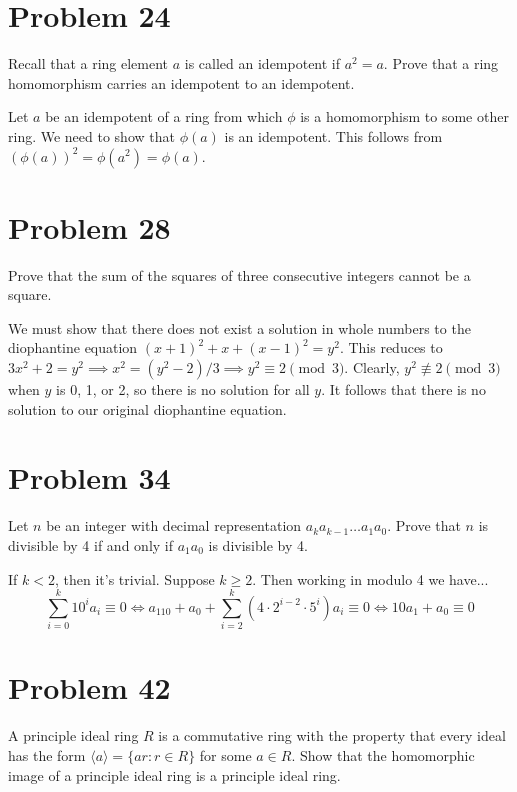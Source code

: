 \documentclass{article}
\begin{document}
\section*{Problem 24}

Recall that a ring element $a$ is called an idempotent if $a^2=a$.
Prove that a ring homomorphism carries an idempotent to an idempotent.

Let $a$ be an idempotent of a ring from which $\phi$ is a homomorphism
to some other ring.
We need to show that $\phi(a)$ is an idempotent.
This follows from $(\phi(a))^2=\phi(a^2)=\phi(a)$.

\section*{Problem 28}

Prove that the sum of the squares of three consecutive integers cannot be a square.

We must show that there does not exist a solution in whole numbers
to the diophantine equation $(x+1)^2+x+(x-1)^2=y^2$.
This reduces to $3x^2+2=y^2\implies x^2=(y^2-2)/3\implies y^2\equiv 2\pmod{3}$.
Clearly, $y^2\not\equiv 2\pmod{3}$ when $y$ is 0, 1, or 2, so there is
no solution for all $y$.  It follows that there is no solution to our original
diophantine equation.

\section*{Problem 34}

Let $n$ be an integer with decimal representation $a_ka_{k-1}\dots a_1a_0$.
Prove that $n$ is divisible by 4 if and only if $a_1a_0$ is divisible by 4.

If $k<2$, then it's trivial.  Suppose $k\geq 2$.
Then working in modulo 4 we have...
\begin{equation*}
\sum_{i=0}^k 10^ia_i\equiv 0\iff
a_110+a_0+\sum_{i=2}^k (4\cdot 2^{i-2}\cdot 5^i)a_i\equiv 0\iff
10a_1+a_0\equiv 0
\end{equation*}

\section*{Problem 42}

A principle ideal ring $R$ is a commutative ring with the
property that every ideal has the
form $\langle a\rangle=\{ar:r\in R\}$ for some $a\in R$.
Show that the homomorphic image of a principle ideal ring
is a principle ideal ring.
\end{document}
